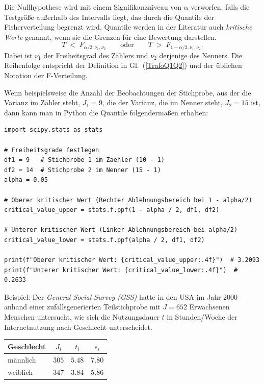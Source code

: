 Die Nullhypothese wird mit einem Signifikanzniveau von $\alpha$
verworfen, falls die Testgröße außerhalb des Intervalls liegt,
das durch die Quantile der Fisherverteilung begrenzt wird. 
Quantile werden in der Literatur auch \textsl{kritische Werte} genannt,
wenn sie die Grenzen für eine Bewertung darstellen.
\begin{equation}
T \; < \; F_{\alpha/2, \nu_1, \nu_2}  \qquad \mathrm{oder} \qquad
T \; > \; F_{1-\alpha/2, \nu_1, \nu_2} .
\end{equation}
Dabei ist $\nu_1$ der Freiheitsgrad des Zählers und $\nu_2$ derjenige des Nenners.
Die Reihenfolge entspricht der Definition in Gl.~(\ref{TrafoQ1Q2}) und der üblichen
Notation der F-Verteilung.

Wenn beispielsweise die Anzahl der Beobachtungen der Stichprobe, aus der die Varianz im Zähler steht, $J_1 = 9$, die der Varianz, die im Nenner steht, $J_2 = 15$ ist, dann kann man in Python die Quantile folgendermaßen erhalten:

\begin{lstlisting}[style=Python]
import scipy.stats as stats

# Freiheitsgrade festlegen
df1 = 9   # Stichprobe 1 im Zaehler (10 - 1)
df2 = 14  # Stichprobe 2 im Nenner (15 - 1)
alpha = 0.05

# Oberer kritischer Wert (Rechter Ablehnungsbereich bei 1 - alpha/2)
critical_value_upper = stats.f.ppf(1 - alpha / 2, df1, df2)

# Unterer kritischer Wert (Linker Ablehnungsbereich bei alpha/2)
critical_value_lower = stats.f.ppf(alpha / 2, df1, df2)

print(f"Oberer kritischer Wert: {critical_value_upper:.4f}")  # 3.2093
print(f"Unterer kritischer Wert: {critical_value_lower:.4f}")  # 0.2633
\end{lstlisting}

Beispiel:
Der \textsl{General Social Survey (GSS)} hatte in den USA im Jahr 2000 anhand einer
zufallsgenerierten Teilstichprobe mit $J = 652$ Erwachsenen Menschen untersucht,
wie sich die Nutzungsdauer $t$ in Stunden/Woche der Internetnutzung nach Geschlecht unterscheidet.

\begin{center}
\begin{tabular}{l|ccc}
Geschlecht & $J_i$ & $t_i$ & $s_i$\\
\hline\hline
männlich & $305$ & $5.48$ & $7.80$\\
\hline
weiblich & $347$ & $3.84$ & $5.86$
\end{tabular}
\end{center}

